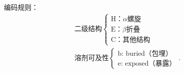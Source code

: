 编码规则：
\begin{align*}
    \text{二级结构}
    \begin{cases}
        \text{H：}\alpha\text{螺旋}\\
        \text{E：}\beta\text{折叠}\\
        \text{C：其他结构}
    \end{cases}\\
    \text{溶剂可及性}\begin{cases}
        \text{b: buried（包埋）}\\
        \text{e: exposed（暴露）}
    \end{cases}
.\end{align*}
